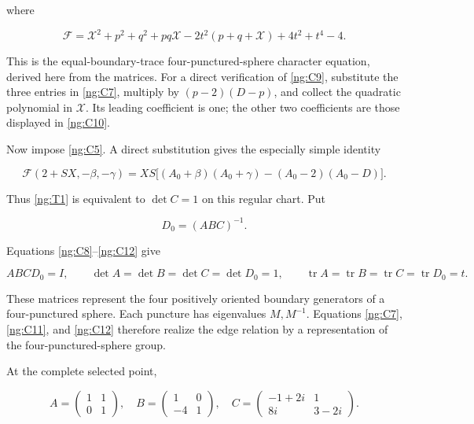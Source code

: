 where

\begin{equation}\label{ng:C10}
\mathcal F=
 \mathcal X^2+p^2+q^2+pq\mathcal X-2t^2(p+q+\mathcal X)+4t^2+t^4-4.
\end{equation}

This is the equal-boundary-trace four-punctured-sphere character equation, derived here from the matrices. For a direct verification of \eqref{ng:C9}, substitute the three entries in \eqref{ng:C7}, multiply by \((p-2)(D-p)\), and collect the quadratic polynomial in \(\mathcal X\). Its leading coefficient is one; the other two coefficients are those displayed in \eqref{ng:C10}.

Now impose \eqref{ng:C5}. A direct substitution gives the especially simple identity

\begin{equation}\label{ng:C11}
\mathcal F(2+SX,-\beta,-\gamma)
 =XS\bigl[(A_0+\beta)(A_0+\gamma)
                         -(A_0-2)(A_0-D)\bigr].
\end{equation}

Thus \eqref{ng:T1} is equivalent to \(\det C=1\) on this regular chart. Put

\begin{equation}\label{ng:C12}
D_0=(ABC)^{-1}.
\end{equation}

Equations \eqref{ng:C8}--\eqref{ng:C12} give

\begin{equation}\label{ng:C13}
ABCD_0=I,\qquad
 \det A=\det B=\det C=\det D_0=1,\qquad
 \operatorname{tr}A=\operatorname{tr}B
       =\operatorname{tr}C=\operatorname{tr}D_0=t.
\end{equation}

These matrices represent the four positively oriented boundary generators of a four-punctured sphere. Each puncture has eigenvalues \(M,M^{-1}\). Equations \eqref{ng:C7}, \eqref{ng:C11}, and \eqref{ng:C12}
therefore realize the edge relation by a representation of the
four-punctured-sphere group.

At the complete selected point,

\begin{equation}\label{ng:C14}
A=\begin{pmatrix}1&1\\0&1\end{pmatrix},\quad
 B=\begin{pmatrix}1&0\\-4&1\end{pmatrix},\quad
 C=\begin{pmatrix}-1+2i&1\\8i&3-2i\end{pmatrix}.
\end{equation}

